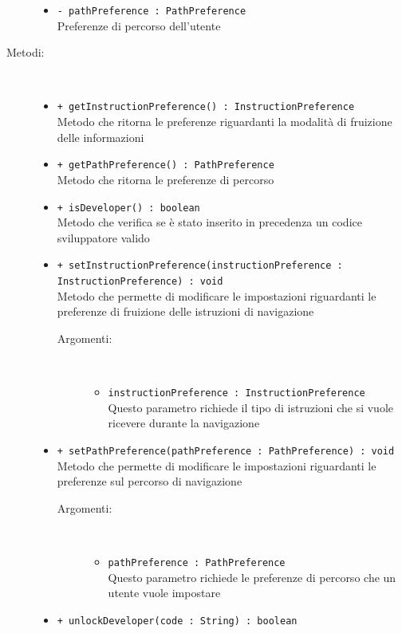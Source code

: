 \documentclass[../DefinizioneDiProdotto.tex]{subfiles}
\begin{document}
\begin{description}
\begin{itemize}
\item \texttt{- pathPreference : PathPreference}\\
Preferenze di percorso dell'utente

\end{itemize}
\item[Metodi:] \
\begin{itemize}
\item \texttt{+ getInstructionPreference() : InstructionPreference}\\
Metodo che ritorna le preferenze riguardanti la modalità di fruizione delle informazioni
 \item \texttt{+ getPathPreference() : PathPreference}\\
Metodo che ritorna le preferenze di percorso
 \item \texttt{+ isDeveloper() : boolean}\\
Metodo che verifica se è stato inserito in precedenza un codice sviluppatore valido
 \item \texttt{+ setInstructionPreference(instructionPreference : InstructionPreference) : void}\\
Metodo che permette di modificare le impostazioni riguardanti le preferenze di fruizione delle istruzioni di navigazione
 \begin{description}
\item[Argomenti:] \
\begin{itemize}
\item \texttt{instructionPreference : InstructionPreference}\\
Questo parametro richiede il tipo di istruzioni che si vuole ricevere durante la navigazione \end{itemize}
\end{description}
\item \texttt{+ setPathPreference(pathPreference : PathPreference) : void}\\
Metodo che permette di modificare le impostazioni riguardanti le preferenze sul percorso di navigazione
 \begin{description}
\item[Argomenti:] \
\begin{itemize}
\item \texttt{pathPreference : PathPreference}\\
Questo parametro richiede le preferenze di percorso che un utente vuole impostare\end{itemize}
\end{description}
\item \texttt{+ unlockDeveloper(code : String) : boolean}\\

\end{itemize}
\end{description}
\end{document}
